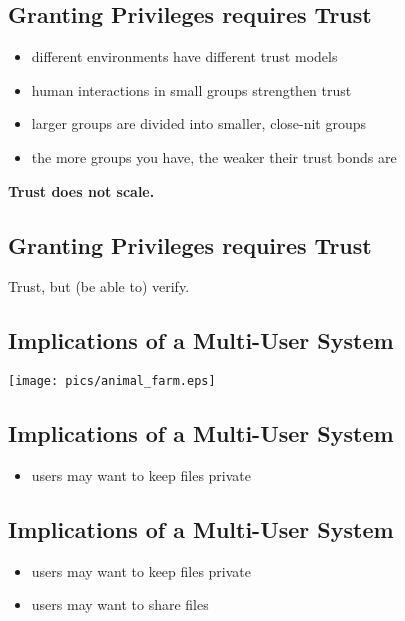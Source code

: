 \documentclass[xga]{xdvislides}
\begin{document}
\subsection{Granting Privileges requires Trust}
\begin{itemize}
	\item different environments have different trust models
	\item human interactions in small groups strengthen trust
	\item larger groups are divided into smaller, close-nit groups
	\item the more groups you have, the weaker their trust bonds are
\end{itemize}
\vspace{.5in}

\begin{center}
	\Huge
	{\bf Trust does not scale.}
	\Normalsize
\end{center}

\subsection{Granting Privileges requires Trust}
\vfill
\begin{center}
	\Huge
	Trust, but (be able to) verify.
	\Normalsize
\end{center}
\vfill

\subsection{Implications of a Multi-User System}
\vspace*{\fill}
\begin{center}
	\texttt{[image: pics/animal\_farm.eps]}
\end{center}
\vspace*{\fill}

\subsection{Implications of a Multi-User System}
\begin{itemize}
	\item users may want to keep files private
\end{itemize}

\subsection{Implications of a Multi-User System}
\begin{itemize}
	\item users may want to keep files private
	\item users may want to share files
\end{itemize}
\end{document}
